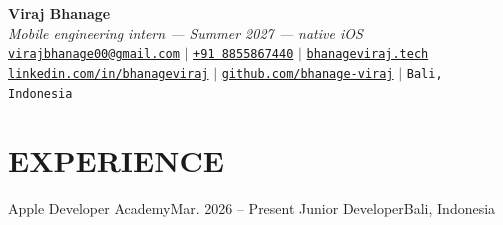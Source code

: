 


\begin{center}
    \textbf{\Huge Viraj Bhanage} \\ \vspace{4pt}
    {\small\textit{Mobile engineering intern --- Summer 2027 --- native iOS}} \\ \vspace{4pt}
    \small
    \faEnvelope \hspace{2pt} \href{mailto:virajbhanage00@gmail.com}{\texttt{virajbhanage00@gmail.com}} \hspace{1pt} $|$
    \hspace{1pt} \faPhone \hspace{2pt} \href{tel:+918855867440}{\texttt{+91 8855867440}} \hspace{1pt} $|$
    \hspace{1pt} \href{https://www.bhanageviraj.tech}{\texttt{bhanageviraj.tech}} \\
    \faLinkedin \hspace{2pt} \href{https://www.linkedin.com/in/bhanageviraj/}{\texttt{linkedin.com/in/bhanageviraj}} \hspace{1pt} $|$
    \hspace{1pt} \faGithub \hspace{2pt} \href{https://github.com/bhanage-viraj}{\texttt{github.com/bhanage-viraj}} \hspace{1pt} $|$
    \hspace{1pt} \faMapMarker* \hspace{2pt}\texttt{Bali, Indonesia}
\end{center}

\section{EXPERIENCE}
  \resumeSubHeadingListStart
    \resumeSubheading
      {Apple Developer Academy}{Mar. 2026 -- Present}
      {Junior Developer}{Bali, Indonesia}
      \resumeItemListStart
      \resumeItemListEnd
  \resumeSubHeadingListEnd

